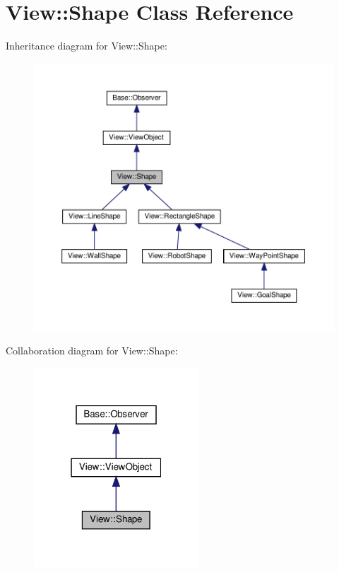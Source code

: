 \hypertarget{class_view_1_1_shape}{}\section{View\+:\+:Shape Class Reference}
\label{class_view_1_1_shape}


Inheritance diagram for View\+:\+:Shape\+:
\nopagebreak
\begin{figure}[H]
\begin{center}
\leavevmode
\includegraphics[width=350pt]{class_view_1_1_shape__inherit__graph}
\end{center}
\end{figure}


Collaboration diagram for View\+:\+:Shape\+:
\nopagebreak
\begin{figure}[H]
\begin{center}
\leavevmode
\includegraphics[width=175pt]{class_view_1_1_shape__coll__graph}
\end{center}
\end{figure}
